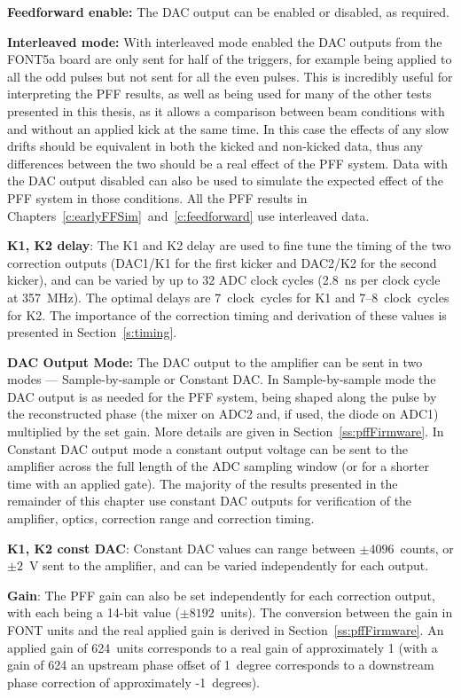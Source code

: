 \textbf{Feedforward enable:} The DAC output can be enabled or disabled, as required.

\textbf{Interleaved mode:} With interleaved mode enabled the DAC outputs from the FONT5a board are only sent for half of the triggers, for example being applied to all the odd pulses but not sent for all the even pulses. This is incredibly useful for interpreting the PFF results, as well as being used for many of the other tests presented in this thesis, as it allows a comparison between beam conditions with and without an applied kick at the same time. In this case the effects of any slow drifts should be equivalent in both the kicked and non-kicked data, thus any differences between the two should be a real effect of the PFF system. Data with the DAC output disabled can also be used to simulate the expected effect of the PFF system in those conditions. All the PFF results in Chapters~\ref{c:earlyFFSim}~and~\ref{c:feedforward} use interleaved data.

\textbf{K1, K2 delay}: The K1 and K2 delay are used to fine tune the timing of the two correction outputs (DAC1/K1 for the first kicker and DAC2/K2 for the second kicker), and can be varied by up to 32 ADC clock cycles (2.8~ns per clock cycle at 357~MHz). The optimal delays are 7~clock~cycles for K1 and 7--8~clock~cycles for K2. The importance of the correction timing and derivation of these values is presented in Section~\ref{s:timing}.

\textbf{DAC Output Mode:} The DAC output to the amplifier can be sent in two modes --- Sample-by-sample or Constant DAC. In Sample-by-sample mode the DAC output is as needed for the PFF system, being shaped along the pulse by the reconstructed phase (the mixer on ADC2 and, if used, the diode on ADC1) multiplied by the set gain. More details are given in Section~\ref{ss:pffFirmware}. In Constant DAC output mode a constant output voltage can be sent to the amplifier across the full length of the ADC sampling window (or for a shorter time with an applied gate). The majority of the results presented in the remainder of this chapter use constant DAC outputs for verification of the amplifier, optics, correction range and correction timing.

\textbf{K1, K2 const DAC}: Constant DAC values can range between \(\pm4096\)~counts, or \(\pm2\)~V sent to the amplifier, and can be varied independently for each output.

\textbf{Gain}: The PFF gain can also be set independently for each correction output, with each being a 14-bit value (\(\pm8192\)~units). The conversion between the gain in FONT units and the real applied gain is derived in Section~\ref{ss:pffFirmware}. An applied gain of 624~units corresponds to a real gain of approximately 1 (with a gain of 624 an upstream phase offset of 1~degree corresponds to a downstream phase correction of approximately -1~degrees).

